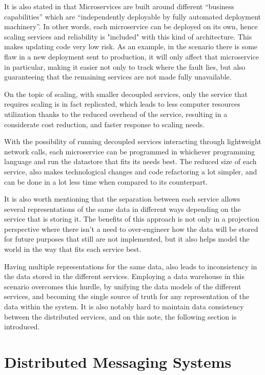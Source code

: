 It is also stated in \cite{MartinFowlerMicroservices} that Microservices are
built around different ``business capabilities'' which are ``independently
deployable by fully automated deployment machinery''. In other words, each
microservice can be deployed on its own, hence scaling services and reliability
is "included" with this kind of architecture. This makes updating code very low
risk. As an example, in the scenario there is some flaw in a new deployment sent
to production, it will only affect that microservice in particular, making it
easier not only to track where the fault lies, but also guaranteeing that the
remaining services are not made fully unavailable.

On the topic of scaling, with smaller decoupled services, only the service that
requires scaling is in fact replicated, which leads to less computer resources
utilization thanks to the reduced overhead of the service, resulting in a
considerate cost reduction, and faster response to scaling needs.

With the possibility of running decoupled services interacting through
lightweight network calls, each microservice can be programmed in whichever
programming language and run the datastore that fits its needs best. The reduced
size of each service, also makes technological changes and code refactoring a
lot simpler, and can be done in a lot less time when compared to its counterpart.

It is also worth mentioning that the separation between each service allows
several representations of the same data in different ways depending on the
service that is storing it. The benefits of this approach is not only in a
projection perspective where there isn't a need to over-engineer how the data
will be stored for future purposes that still are not implemented, but it also
helps model the world in the way that fits each service best. 

Having multiple representations for the same data, also leads to inconsistency
in the data stored in the different services. Employing a data warehouse in this
scenario overcomes this hurdle, by unifying the data models of the different
services, and becoming the single source of truth for any representation of the
data within the system. It is also notably hard to maintain data consistency
between the distributed services, and on this note, the following section is
introduced.

\section{Distributed Messaging Systems}\label{sec:DMS}

